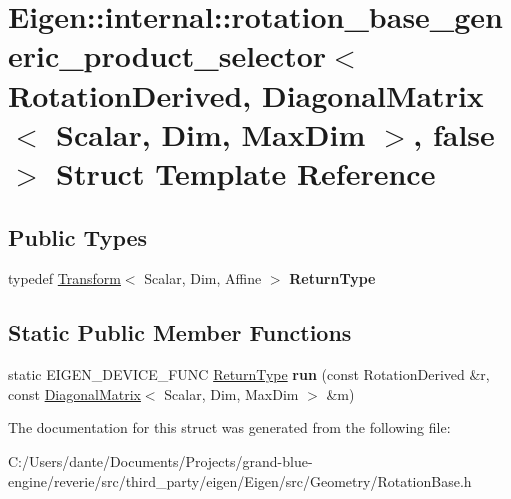 \hypertarget{struct_eigen_1_1internal_1_1rotation__base__generic__product__selector_3_01_rotation_derived_00_7e855ad9d8f41d04ee2e0f10c5040984}{}\section{Eigen\+::internal\+::rotation\+\_\+base\+\_\+generic\+\_\+product\+\_\+selector$<$ Rotation\+Derived, Diagonal\+Matrix$<$ Scalar, Dim, Max\+Dim $>$, false $>$ Struct Template Reference}
\label{struct_eigen_1_1internal_1_1rotation__base__generic__product__selector_3_01_rotation_derived_00_7e855ad9d8f41d04ee2e0f10c5040984}
\subsection*{Public Types}
\begin{DoxyCompactItemize}
\item 
\mbox{\label{struct_eigen_1_1internal_1_1rotation__base__generic__product__selector_3_01_rotation_derived_00_7e855ad9d8f41d04ee2e0f10c5040984_a85185b2776cd7e5617639cc40a9c5a98}} 
typedef \mbox{\hyperlink{class_eigen_1_1_transform}{Transform}}$<$ Scalar, Dim, Affine $>$ {\bfseries Return\+Type}
\end{DoxyCompactItemize}
\subsection*{Static Public Member Functions}
\begin{DoxyCompactItemize}
\item 
\mbox{\label{struct_eigen_1_1internal_1_1rotation__base__generic__product__selector_3_01_rotation_derived_00_7e855ad9d8f41d04ee2e0f10c5040984_af4fa0ba69413fd6ba05f27353436d1d3}} 
static E\+I\+G\+E\+N\+\_\+\+D\+E\+V\+I\+C\+E\+\_\+\+F\+U\+NC \mbox{\hyperlink{class_eigen_1_1_transform}{Return\+Type}} {\bfseries run} (const Rotation\+Derived \&r, const \mbox{\hyperlink{class_eigen_1_1_diagonal_matrix}{Diagonal\+Matrix}}$<$ Scalar, Dim, Max\+Dim $>$ \&m)
\end{DoxyCompactItemize}


The documentation for this struct was generated from the following file\+:\begin{DoxyCompactItemize}
\item 
C\+:/\+Users/dante/\+Documents/\+Projects/grand-\/blue-\/engine/reverie/src/third\+\_\+party/eigen/\+Eigen/src/\+Geometry/Rotation\+Base.\+h\end{DoxyCompactItemize}

